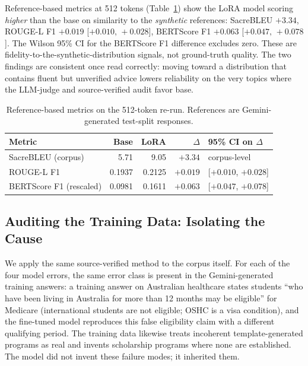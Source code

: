\documentclass[11pt]{article}
\begin{document}
Reference-based metrics at 512 tokens (Table~\ref{tab:std-metrics}) show the LoRA model scoring \emph{higher} than the base on similarity to the \emph{synthetic} references: SacreBLEU $+3.34$, ROUGE-L F1 $+0.019$ [$+0.010,\,+0.028$], BERTScore F1 $+0.063$ [$+0.047,\,+0.078$]. The Wilson 95\% CI for the BERTScore F1 difference excludes zero. These are fidelity-to-the-synthetic-distribution signals, not ground-truth quality. The two findings are consistent once read correctly: moving toward a distribution that contains fluent but unverified advice lowers reliability on the very topics where the LLM-judge and source-verified audit favor base.

\begin{table}[t]\centering
\caption{Reference-based metrics on the 512-token re-run. References are Gemini-generated test-split responses.}\label{tab:std-metrics}
\begin{tabular}{lrrrl}
\hline\textbf{Metric} & \textbf{Base} & \textbf{LoRA} & \textbf{$\Delta$} & \textbf{95\% CI on $\Delta$} \\
\hline
SacreBLEU (corpus) & 5.71 & 9.05 & $+3.34$ & corpus-level \\
ROUGE-L F1 & 0.1937 & 0.2125 & $+0.019$ & [$+0.010$, $+0.028$] \\
BERTScore F1 (rescaled) & 0.0981 & 0.1611 & $+0.063$ & [$+0.047$, $+0.078$] \\
\hline
\end{tabular}
\end{table}

\subsection{Auditing the Training Data: Isolating the Cause}
We apply the same source-verified method to the corpus itself. For each of the four model errors, the same error class is present in the Gemini-generated training answers: a training answer on Australian healthcare states students ``who have been living in Australia for more than 12 months may be eligible'' for Medicare (international students are not eligible; OSHC is a visa condition), and the fine-tuned model reproduces this false eligibility claim with a different qualifying period. The training data likewise treats incoherent template-generated programs as real and invents scholarship programs where none are established. The model did not invent these failure modes; it inherited them.
\end{document}
